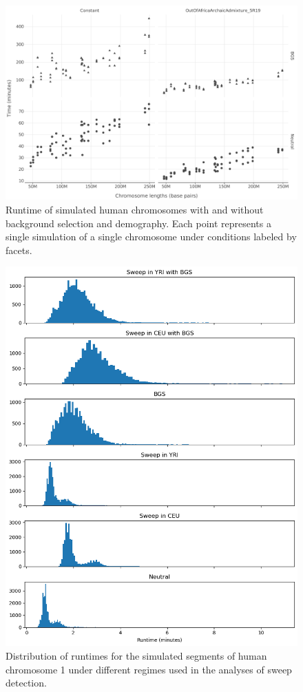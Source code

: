\documentclass[hidelinks]{article}
\newcommand{\stopsupplement}{%
        \setcounter{table}{0}
        \renewcommand{\thetable}{\arabic{table}}%
        \setcounter{figure}{0}
        \renewcommand{\thefigure}{\arabic{figure}}%
     }
\begin{document}
\begin{figure}[h]
    \centering
    \includegraphics[width=0.8 \textwidth]{figures/HomSap/sims_runtime_plot.pdf}
    \caption{
    Runtime of simulated human chromosomes with and without background selection and demography.
    Each point represents a single simulation of a single chromosome under conditions labeled by facets.
    }
    \label{fig:sim-runtime}
\end{figure}

\begin{figure}[h]
    \centering
    \includegraphics[width=0.8 \textwidth]{figures/sweeps/runtime.png}
    \caption{
    Distribution of runtimes for the simulated segments of human chromosome 1 under different regimes used in the analyses of sweep detection.
    }
    \label{fig:sim-sweeps-runtime}
\end{figure}

\stopsupplement

\end{document}

